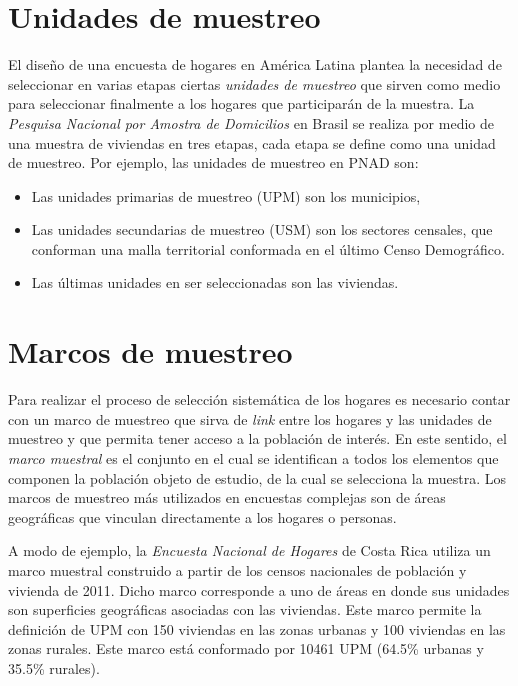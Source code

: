 \documentclass[
  12pt,
]{book}
\providecommand{\tightlist}{%
  \setlength{\itemsep}{0pt}\setlength{\parskip}{0pt}}
\begin{document}
\section{Unidades de muestreo}\label{unidades-de-muestreo}

El diseño de una encuesta de hogares en América Latina plantea la necesidad de seleccionar en varias etapas ciertas \emph{unidades de muestreo} que sirven como medio para seleccionar finalmente a los hogares que participarán de la muestra. La \emph{Pesquisa Nacional por Amostra de Domicilios} en Brasil se realiza por medio de una muestra de viviendas en tres etapas, cada etapa se define como una unidad de muestreo. Por ejemplo, las unidades de muestreo en PNAD son:

\begin{itemize}
\tightlist
\item
  Las unidades primarias de muestreo (UPM) son los municipios,
\item
  Las unidades secundarias de muestreo (USM) son los sectores censales, que conforman una malla territorial conformada en el último Censo Demográfico.
\item
  Las últimas unidades en ser seleccionadas son las viviendas.
\end{itemize}

\section{Marcos de muestreo}\label{marcos-de-muestreo}

Para realizar el proceso de selección sistemática de los hogares es necesario contar con un marco de muestreo que sirva de \emph{link} entre los hogares y las unidades de muestreo y que permita tener acceso a la población de interés. En este sentido, el \emph{marco muestral} es el conjunto en el cual se identifican a todos los elementos que componen la población objeto de estudio, de la cual se selecciona la muestra. Los marcos de muestreo más utilizados en encuestas complejas son de áreas geográficas que vinculan directamente a los hogares o personas.

A modo de ejemplo, la \emph{Encuesta Nacional de Hogares} de Costa Rica utiliza un marco muestral construido a partir de los censos nacionales de población y vivienda de 2011. Dicho marco corresponde a uno de áreas en donde sus unidades son superficies geográficas asociadas con las viviendas. Este marco permite la definición de UPM con 150 viviendas en las zonas urbanas y 100 viviendas en las zonas rurales. Este marco está conformado por 10461 UPM (64.5\% urbanas y 35.5\% rurales).
\end{document}
